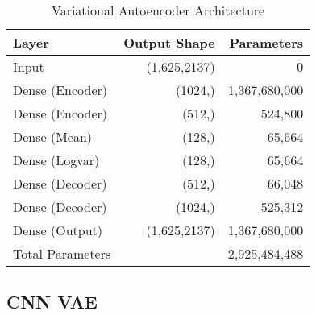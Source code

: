 \begin{table}[!h]
    \centering
    \begin{tabular}{lrr}
        \toprule
        Layer & Output Shape & Parameters \\
        \midrule
        Input & (1,625,2137) & 0 \\
        Dense (Encoder) & (1024,) & 1,367,680,000 \\
        Dense (Encoder) & (512,) & 524,800 \\
        Dense (Mean) & (128,) & 65,664 \\
        Dense (Logvar) & (128,) & 65,664 \\
        Dense (Decoder) & (512,) & 66,048 \\
        Dense (Decoder) & (1024,) & 525,312 \\
        Dense (Output) & (1,625,2137) & 1,367,680,000 \\
        \midrule
        Total Parameters & & 2,925,484,488 \\
        \bottomrule
    \end{tabular}
    \caption{Variational Autoencoder Architecture}
    \label{tab:vae}
\end{table}



\subsection{CNN VAE}
\label{app:a-cvae}

